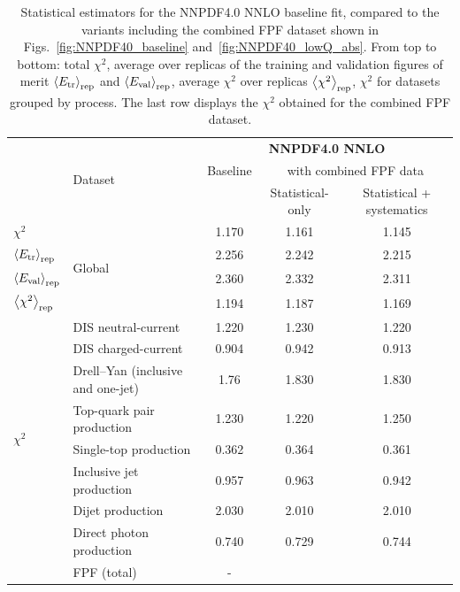 \begin{table}[!t]
  \centering
  \footnotesize
  \renewcommand{\arraystretch}{1.30}
  \begin{tabularx}{\textwidth}{X|l|c|c|c}
  \toprule
  & \multirow{3}{*}{Dataset}
  & \multicolumn{3}{c}{\bf NNPDF4.0 NNLO} \\
  &
  & Baseline
  & \multicolumn{2}{c}{with combined FPF data}  \\
  &
  &
  & Statistical-only  & Statistical + systematics  \\
  \midrule
  $\chi^2$ &  \multirow{4}{*}{Global}  & 1.170 &  1.161  & 1.145  \\
  $\left\langle E_{\rm tr}\right\rangle_{\rm rep}$
  &  &  2.256  &  2.242   & 2.215   \\
  $\left\langle E_{\rm val}\right\rangle_{\rm rep}$
  & & 2.360    &   2.332  & 2.311  \\
  $\left\langle \chi^2\right\rangle_{\rm rep}$
  & &   1.194   &    1.187    & 1.169  \\
  \midrule
  \multirow{8}{*}{$\chi^2$}
  & DIS neutral-current                     &  1.220    &  1.230    &   1.220   \\
  & DIS charged-current                     &   0.904  &   0.942    &  0.913    \\
  & Drell--Yan (inclusive and one-jet) &  1.76   &   1.830    &   1.830   \\
  & Top-quark pair production               &  1.230   &   1.220    &  1.250    \\
  & Single-top production                   &  0.362   &   0.364    &   0.361   \\
  & Inclusive jet production                &  0.957   &  0.963     &   0.942   \\
  & Dijet production                        &  2.030    &    2.010   &   2.010   \\
  & Direct photon production                 &  0.740  &   0.729    &    0.744  \\
  & FPF (total)                 &  -  &       &      \\
  \bottomrule
\end{tabularx}
\vspace{0.2cm}
\caption{\small Statistical estimators for the NNPDF4.0 NNLO
  baseline fit, compared to the variants including
  the combined FPF dataset shown in Figs.~\ref{fig:NNPDF40_baseline}
  and~\ref{fig:NNPDF40_lowQ_abs}.
  From top to bottom: total $\chi^2$, average
  over replicas of the training and validation figures of merit
  $\left\langle E_{\rm tr}\right\rangle_{\rm rep}$ and $\left\langle E_{\rm val}\right\rangle_{\rm rep}$,
  average $\chi^2$ over replicas $\left\langle \chi^2\right\rangle_{\rm rep}$,
  $\chi^2$ for datasets grouped by process.
  The last row displays the $\chi^2$ obtained for the combined FPF dataset.
  \label{tab:chi2_nnpdf40_baseline}
}
\end{table}

